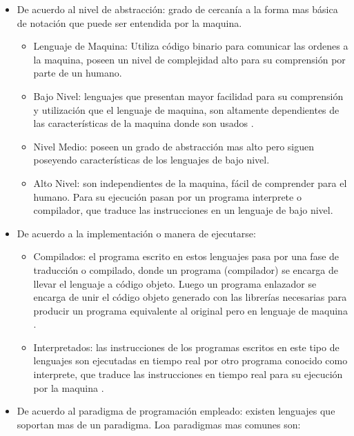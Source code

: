 \begin{itemize}
\item De acuerdo al nivel de abstracción: grado de cercanía a la forma mas básica de notación que puede ser entendida por la maquina.

  \begin{itemize}
  \item Lenguaje de Maquina: Utiliza código binario para comunicar las ordenes a la maquina, poseen un nivel de complejidad alto para su comprensión por parte de un humano.
  \item Bajo Nivel: lenguajes que presentan mayor facilidad para su comprensión y utilización que el lenguaje de maquina, son altamente dependientes de las características de la maquina donde son usados \cite{80}. 
  \item Nivel Medio: poseen un grado de abstracción mas alto pero siguen poseyendo características de los lenguajes de bajo nivel.\cite{80}
  \item Alto Nivel: son independientes de la maquina, fácil de comprender para el humano. Para su ejecución pasan por un programa interprete o compilador, que traduce las instrucciones en un lenguaje de bajo nivel.\cite{80}
  \end{itemize}
  
 \item De acuerdo a la implementación o manera de ejecutarse:
   \begin{itemize}
   \item Compilados: el programa escrito en estos lenguajes pasa por una fase de traducción o compilado, donde un programa (compilador) se encarga de llevar el lenguaje a código objeto. Luego un programa enlazador se encarga de unir el código objeto generado con las librerías necesarias para producir un programa equivalente al original pero en lenguaje de maquina \cite{81}. 
   \item Interpretados: las instrucciones de los programas escritos en este tipo de lenguajes son ejecutadas en tiempo real por otro programa conocido como interprete, que traduce las instrucciones en tiempo real para su ejecución por la maquina \cite{81}.
   \end{itemize}
   
\item De acuerdo al paradigma de programación empleado: existen lenguajes que soportan mas de un paradigma. Loa paradigmas mas comunes son:


\end{itemize}
